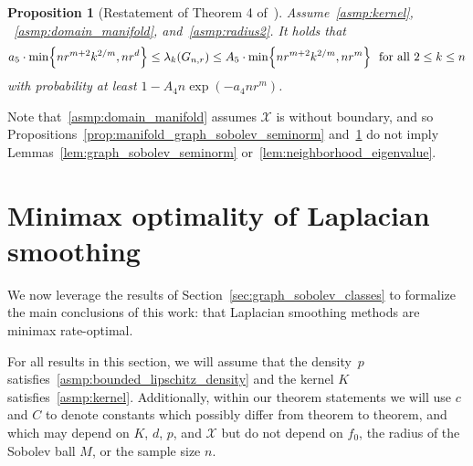 \documentclass{article}
\newcommand{\1}{\mathbf{1}}
\newcommand{\Xset}{\mathcal{X}}
\theoremstyle{alden}
\theoremstyle{aldenthm}
\newtheorem{proposition}{Proposition}
\theoremstyle{definition}
\theoremstyle{remark}
\begin{document}
\begin{proposition}[Restatement of Theorem 4 of~\cite{trillos2019}]
	\label{prop:manifold_neighborhood_eigenvalue}
	Assume~\ref{asmp:kernel}, ~\ref{asmp:domain_manifold}, and~\ref{asmp:radius2}. It holds that
	\begin{equation}
	\label{eqn:manifold_neighborhood_eigenvalue}
	a_5 \cdot \min\Bigl\{nr^{m + 2}k^{2/m},nr^d\Bigr\} \leq \lambda_k(G_{n,r}) \leq A_5 \cdot \min\Bigl\{nr^{m + 2}k^{2/m}, nr^m\Bigr\}~~\textrm{for all $2 \leq k \leq n$}	
	\end{equation}
	with probability at least $1 - A_4n\exp(-a_4nr^m)$.
\end{proposition}
Note that~\ref{asmp:domain_manifold} assumes $\Xset$ is without boundary, and so Propositions~\ref{prop:manifold_graph_sobolev_seminorm} and~\ref{prop:manifold_neighborhood_eigenvalue} do not imply Lemmas~\ref{lem:graph_sobolev_seminorm} or~\ref{lem:neighborhood_eigenvalue}.

\section{Minimax optimality of Laplacian smoothing}
\label{sec:minimax_optimal_laplacian_smoothing}

We now leverage the results of Section~\ref{sec:graph_sobolev_classes} to formalize the main conclusions of this work: that Laplacian smoothing methods are minimax rate-optimal. 

For all results in this section, we will assume that the density~$p$ satisfies~\ref{asmp:bounded_lipschitz_density} and the kernel $K$ satisfies~\ref{asmp:kernel}. Additionally, within our theorem statements we will use $c$ and $C$ to denote constants which possibly differ from theorem to theorem, and which may depend on $K$, $d$, $p$, and $\Xset$ but do not depend on $f_0$, the radius of the Sobolev ball $M$, or the sample size $n$. 
\end{document}
